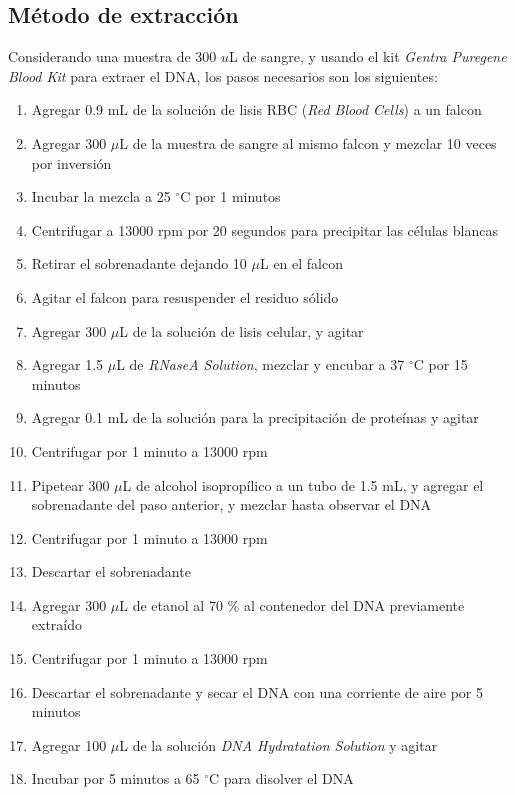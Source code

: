 \documentclass[12pt]{article}
\begin{document}
		\subsection{M\'etodo de extracci\'on}
			Considerando una muestra de 300 $u$L de sangre, y usando el kit \textit{Gentra Puregene Blood Kit} para extraer el DNA, los pasos necesarios son los siguientes:
			\begin{enumerate}[label=\color{blue}\theenumi]
				\item Agregar 0.9 mL de la soluci\'on de lisis RBC (\textit{Red Blood Cells}) a un falcon
				\item Agregar 300 $\mu$L de la muestra de sangre al mismo falcon y mezclar 10 veces por inversi\'on
				\item Incubar la mezcla a 25 $^\circ$C por 1 minutos
				\item Centrifugar a 13000 rpm por 20 segundos para precipitar las c\'elulas blancas
				\item Retirar el sobrenadante dejando 10 $\mu$L en el falcon
				\item Agitar el falcon para resuspender el residuo s\'olido
				\item Agregar 300 $\mu$L de la soluci\'on de lisis celular, y agitar
				\item Agregar 1.5 $\mu$L de \textit{RNaseA Solution}, mezclar y encubar a 37 $^\circ$C por 15 minutos
				\item Agregar 0.1 mL de la soluci\'on para la precipitaci\'on de prote\'inas y agitar
				\item Centrifugar por 1 minuto a 13000 rpm
				\item Pipetear 300 $\mu$L de alcohol isoprop\'ilico a un tubo de 1.5 mL, y agregar el sobrenadante del paso anterior, y mezclar hasta observar el DNA
				\item Centrifugar por 1 minuto a 13000 rpm
				\item Descartar el sobrenadante
				\item Agregar 300 $\mu$L de etanol al 70 \% al contenedor del DNA previamente extra\'ido
				\item Centrifugar por 1 minuto a 13000 rpm
				\item Descartar el sobrenadante y secar el DNA con una corriente de aire por 5 minutos
				\item Agregar 100 $\mu$L de la soluci\'on \textit{DNA Hydratation Solution} y agitar
				\item Incubar por 5 minutos a 65 $^\circ$C para disolver el DNA
			\end{enumerate}
			
\end{document}
